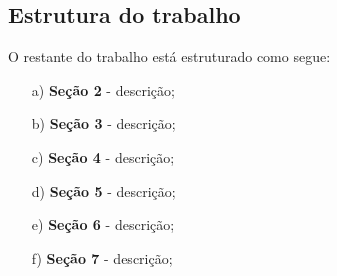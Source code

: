 \subsection*{Estrutura do trabalho}

O restante do trabalho está estruturado como segue:

\begin{enumerate}
\item[a)] \textbf{Seção 2} - descrição;
\item[b)] \textbf{Seção 3} - descrição;
\item[c)] \textbf{Seção 4} - descrição;
\item[d)] \textbf{Seção 5} - descrição;
\item[e)] \textbf{Seção 6} - descrição;
\item[f)] \textbf{Seção 7} - descrição;
\end{enumerate}
